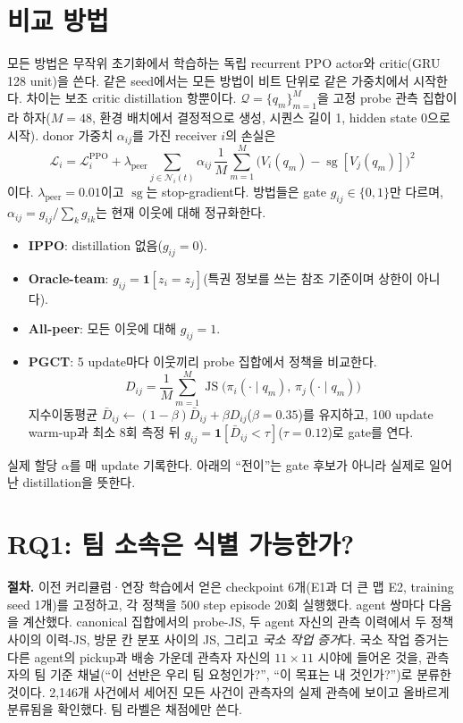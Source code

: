 \documentclass[twocolumn,10pt]{article}
\newcommand{\sg}{\operatorname{sg}}
\newcommand{\JS}{\operatorname{JS}}
\begin{document}
\section{비교 방법}
모든 방법은 무작위 초기화에서 학습하는 독립 recurrent PPO actor와 critic(GRU 128 unit)을 쓴다. 같은 seed에서는 모든
방법이 비트 단위로 같은 가중치에서 시작한다. 차이는 보조 critic distillation 항뿐이다. $\mathcal{Q}=\{q_m\}_{m=1}^{M}$을
고정 probe 관측 집합이라 하자($M=48$, 환경 배치에서 결정적으로 생성, 시퀀스 길이 1, hidden state 0으로 시작).
donor 가중치 $\alpha_{ij}$를 가진 receiver $i$의 손실은
\begin{equation}
  \mathcal{L}_i = \mathcal{L}^{\mathrm{PPO}}_i + \lambda_{\mathrm{peer}} \sum_{j\in\mathcal{N}_i(t)} \alpha_{ij}\,
  \frac{1}{M}\sum_{m=1}^{M}\big(V_i(q_m) - \sg[V_j(q_m)]\big)^2
\end{equation}
이다. $\lambda_{\mathrm{peer}}=0.01$이고 $\sg$는 stop-gradient다. 방법들은 gate $g_{ij}\in\{0,1\}$만 다르며,
$\alpha_{ij}=g_{ij}/\sum_k g_{ik}$는 현재 이웃에 대해 정규화한다.
\begin{itemize}
  \item \textbf{IPPO}: distillation 없음($g_{ij}=0$).
  \item \textbf{Oracle-team}: $g_{ij}=\mathbf{1}[z_i=z_j]$(특권 정보를 쓰는 참조 기준이며 상한이 아니다).
  \item \textbf{All-peer}: 모든 이웃에 대해 $g_{ij}=1$.
  \item \textbf{PGCT}: 5 update마다 이웃끼리 probe 집합에서 정책을 비교한다.
  \begin{equation}
    D_{ij} = \frac{1}{M}\sum_{m=1}^{M} \JS\big(\pi_i(\cdot\mid q_m),\, \pi_j(\cdot\mid q_m)\big)
  \end{equation}
  지수이동평균 $\bar D_{ij}\leftarrow(1-\beta)\bar D_{ij}+\beta D_{ij}$($\beta=0.35$)를 유지하고, 100 update warm-up과
  최소 8회 측정 뒤 $g_{ij}=\mathbf{1}[\bar D_{ij}<\tau]$($\tau=0.12$)로 gate를 연다.
\end{itemize}
실제 할당 $\alpha$를 매 update 기록한다. 아래의 ``전이''는 gate 후보가 아니라 실제로 일어난 distillation을 뜻한다.

\section{RQ1: 팀 소속은 식별 가능한가?}
\textbf{절차.} 이전 커리큘럼·연장 학습에서 얻은 checkpoint 6개(E1과 더 큰 맵 E2, training seed 1개)를 고정하고, 각 정책을
500 step episode 20회 실행했다. agent 쌍마다 다음을 계산했다. canonical 집합에서의 probe-JS, 두 agent 자신의 관측 이력에서
두 정책 사이의 이력-JS, 방문 칸 분포 사이의 JS, 그리고 \emph{국소 작업 증거}다. 국소 작업 증거는 다른 agent의 pickup과
배송 가운데 관측자 자신의 $11\times11$ 시야에 들어온 것을, 관측자의 팀 기준 채널(``이 선반은 우리 팀 요청인가?'',
``이 목표는 내 것인가?'')로 분류한 것이다. 2{,}146개 사건에서 세어진 모든 사건이 관측자의 실제 관측에 보이고 올바르게
분류됨을 확인했다. 팀 라벨은 채점에만 쓴다.
\end{document}
